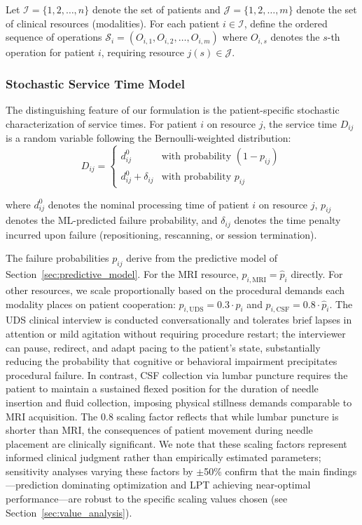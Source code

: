 \documentclass[11pt,a4paper]{article}
\begin{document}
Let $\mathcal{I} = \{1, 2, \ldots, n\}$ denote the set of patients and $\mathcal{J} = \{1, 2, \ldots, m\}$ denote the set of clinical resources (modalities). For each patient $i \in \mathcal{I}$, define the ordered sequence of operations $\mathcal{S}_i = (O_{i,1}, O_{i,2}, \ldots, O_{i,m})$ where $O_{i,s}$ denotes the $s$-th operation for patient $i$, requiring resource $j(s) \in \mathcal{J}$.

\subsubsection{Stochastic Service Time Model}

The distinguishing feature of our formulation is the patient-specific stochastic characterization of service times. For patient $i$ on resource $j$, the service time $D_{ij}$ is a random variable following the Bernoulli-weighted distribution:
\begin{equation}
D_{ij} = 
\begin{cases}
d_{ij}^0 & \text{with probability } (1 - p_{ij}) \\
d_{ij}^0 + \delta_{ij} & \text{with probability } p_{ij}
\end{cases}
\label{eq:service_time_rv}
\end{equation}

where $d_{ij}^0$ denotes the nominal processing time of patient $i$ on resource $j$, $p_{ij}$ denotes the ML-predicted failure probability, and $\delta_{ij}$ denotes the time penalty incurred upon failure (repositioning, rescanning, or session termination).

The failure probabilities $p_{ij}$ derive from the predictive model of Section~\ref{sec:predictive_model}. For the MRI resource, $p_{i,\text{MRI}} = \hat{p}_i$ directly. For other resources, we scale proportionally based on the procedural demands each modality places on patient cooperation: $p_{i,\text{UDS}} = 0.3 \cdot \hat{p}_i$ and $p_{i,\text{CSF}} = 0.8 \cdot \hat{p}_i$. The UDS clinical interview is conducted conversationally and tolerates brief lapses in attention or mild agitation without requiring procedure restart; the interviewer can pause, redirect, and adapt pacing to the patient's state, substantially reducing the probability that cognitive or behavioral impairment precipitates procedural failure. In contrast, CSF collection via lumbar puncture requires the patient to maintain a sustained flexed position for the duration of needle insertion and fluid collection, imposing physical stillness demands comparable to MRI acquisition. The 0.8 scaling factor reflects that while lumbar puncture is shorter than MRI, the consequences of patient movement during needle placement are clinically significant. We note that these scaling factors represent informed clinical judgment rather than empirically estimated parameters; sensitivity analyses varying these factors by $\pm$50\% confirm that the main findings---prediction dominating optimization and LPT achieving near-optimal performance---are robust to the specific scaling values chosen (see Section~\ref{sec:value_analysis}).
\end{document}
